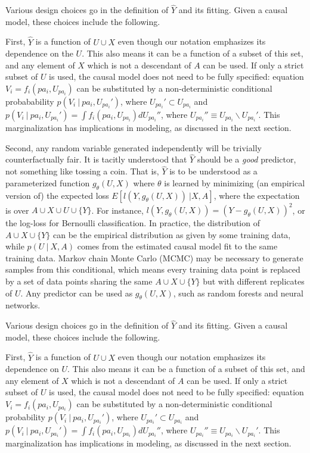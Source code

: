 
Various design choices go in the definition of $\hat Y$ and its fitting. Given a causal model, these choices include the following.

First, $\hat Y$ is a function of $U \cup X$ even though our notation emphasizes its dependence on the $U$. This also means it can be a function of a subset of this set, and any element of $X$ which is not a descendant of $A$ can be used. If only a strict subset of $U$ is used, the causal model does not need to be fully specified: equation $V_i = f_i(pa_i, U_{pa_i})$ can be substituted by a non-deterministic conditional probabability $p(V_i\ |\ pa_i, U_{pa_i}')$, where $U_{pa_i}' \subset U_{pa_i}$ and $p(V_i\ |\ pa_i, U_{pa_i}') = \int f_i(pa_i, U_{pa_i}) d U_{pa_i}''$, where $U_{pa_i}'' \equiv U_{pa_i} \backslash U_{pa_i}'$. This marginalization has implications in modeling, as discussed in the next section.

Second, any random variable generated independently will be trivially counterfactually fair. It is tacitly understood that $\hat Y$ should be a {\it good} predictor, not something like tossing a coin. That is, $\hat Y$ is to be understood as a parameterized function $g_\theta(U, X)$ where $\theta$ is learned by minimizing (an empirical version of) the expected loss $E[l(Y, g_\theta(U, X))\ | X,
  A]$, where the expectation is over $A \cup X \cup U \cup \{Y\}$. For instance, $l(Y, g_\theta(U, X)) = (Y - g_\theta(U, X))^2$, or the log-loss for Bernoulli classification.  In practice, the distribution of $A \cup X \cup \{Y\}$ can be the empirical distribution as given by some training data, while $p(U\ |\ X, A)$ comes from the estimated causal model fit to the same training data. Markov chain Monte Carlo (MCMC) may be necessary to generate samples from this conditional, which means every training data point is replaced by a set of data points sharing the same $A \cup X \cup \{Y\}$ but with different replicates of $U$. Any predictor can be used as $g_\theta(U, X)$, such as random forests and neural networks.

Various design choices go in the definition of $\hat Y$ and its fitting. Given a causal model, these choices include the following.

First, $\hat Y$ is a function of $U \cup X$ even though our notation emphasizes its dependence on $U$. This also means it can be a function of a subset of this set, and any element of $X$ which is not a descendant of $A$ can be used. If only a strict subset of $U$ is used, the causal model does not need to be fully specified: equation $V_i = f_i(pa_i, U_{pa_i})$ can be substituted by a non-deterministic conditional probability $p(V_i\ |\ pa_i, U_{pa_i}')$, where $U_{pa_i}' \subset U_{pa_i}$ and $p(V_i\ |\ pa_i, U_{pa_i}') = \int f_i(pa_i, U_{pa_i}) d U_{pa_i}''$, where $U_{pa_i}'' \equiv U_{pa_i} \backslash U_{pa_i}'$. This marginalization has implications in modeling, as discussed in the next section.

